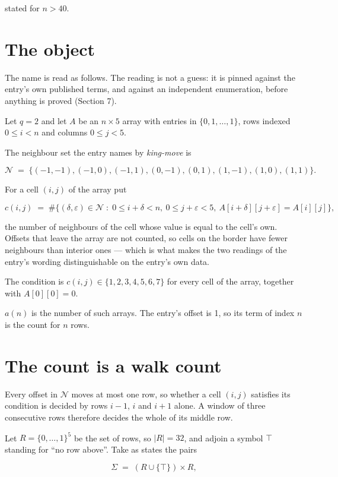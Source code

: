 \documentclass[11pt]{article}
\theoremstyle{definition}
\begin{document}
stated for $n > 40$.

\section{The object}

The name is read as follows. The reading is not a guess: it is pinned against the entry's own published terms, and against an independent enumeration, before anything is proved (Section 7).

Let $q = 2$ and let $A$ be an $n \times 5$ array with entries in $\{0,1,\dots,1\}$, rows indexed $0 \le i < n$ and columns $0 \le j < 5$.

The neighbour set the entry names by {\itshape king-move} is

\[\mathcal{N} \;=\; \{(-1,-1), (-1,0), (-1,1), (0,-1), (0,1), (1,-1), (1,0), (1,1)\}.\]

For a cell $(i,j)$ of the array put

\[c(i,j) \;=\; \#\bigl\{(\delta,\varepsilon)\in\mathcal{N} \;:\; 0\le i+\delta<n,\ 0\le j+\varepsilon<5,\ A[i+\delta][j+\varepsilon] = A[i][j]\bigr\},\]

the number of neighbours of the cell whose value is equal to the cell's own. Offsets that leave the array are not counted, so cells on the border have fewer neighbours than interior ones --- which is what makes the two readings of the entry's wording distinguishable on the entry's own data.

The condition is $c(i,j) \in \{1, 2, 3, 4, 5, 6, 7\}$ for every cell of the array, together with $A[0][0]=0$.

$a(n)$ is the number of such arrays. The entry's offset is 1, so its term of index $n$ is the count for $n$ rows.

\section{The count is a walk count}

Every offset in $\mathcal{N}$ moves at most one row, so whether a cell $(i,j)$ satisfies its condition is decided by rows $i-1$, $i$ and $i+1$ alone. A window of three consecutive rows therefore decides the whole of its middle row.

Let $R = \{0,\dots,1\}^{5}$ be the set of rows, so $|R| = 32$, and adjoin a symbol $\top$ standing for ``no row above''. Take as states the pairs

\[\Sigma \;=\; (R \cup \{\top\}) \times R,\]
\end{document}
